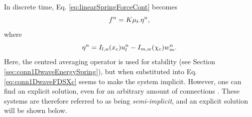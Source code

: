 In discrete time, Eq. \eqref{eq:linearSpringForceCont} becomes
\begin{equation}\label{eq:linearSpringForceDisc}
    f^n = K\mu_{t\cdot}\eta^n,
\end{equation}
where
\begin{equation}\label{eq:discEtaConn1Dwave}
    \eta^n = I_{l, u}(x_{\text{c}})u_l^n - I_{m, w}(\chi_{\text{c}})w_m^n.
\end{equation}
Here, the centred averaging operator is used for stability (see Section \ref{sec:conn1DwaveEnergySpring}), but when substituted into Eq. \eqref{eq:conn1DwaveFDSXc} seems to make the system implicit. However, one can find an explicit solution, even for an arbitrary amount of connections \cite{Bilbao2009Modular}. These systems are therefore referred to as being \textit{semi-implicit}, and an explicit solution will be shown below.

